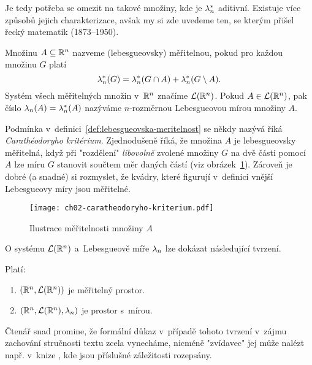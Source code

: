 Je tedy potřeba se omezit na takové množiny, kde je $\lambda_n^*$ aditivní. Existuje více způsobů jejich charakterizace, avšak my si zde uvedeme ten, se kterým přišel řecký matematik  (1873--1950).
\begin{definition}\label{def:lebesgueovska-meritelnost}
    Množinu $A\subseteq\mathbb{R}^n$ nazveme (lebesgueovsky) měřitelnou, pokud pro každou množinu $G$ platí
    \[\lambda_n^*(G)=\lambda_n^*(G\cap A)+\lambda_n^*(G\setminus A).\]
    Systém všech měřitelných množin v~$\mathbb{R}^n$ značíme $\mathcal{L}(\mathbb{R}^n)$.  Pokud $A\in\mathcal{L}(\mathbb{R}^n)$, pak číslo $\lambda_n(A)=\lambda_n^*(A)$ nazýváme $n$-rozměrnou Lebesgueovou mírou množiny $A$.
\end{definition}
Podmínka v~definici~\ref{def:lebesgueovska-meritelnost} se někdy nazývá říká \emph{Carathéodoryho kritérium}. Zjednodušeně říká, že množina $A$ je lebesgueovsky měřitelná, když při "rozdělení" \emph{libovolně} zvolené množiny $G$ na dvě části pomocí $A$ lze míru $G$ stanovit součtem měr daných částí (viz obrázek~\ref{fig:caratheodoryho-kriterium}). Zároveň je dobré (a snadné) si rozmyslet, že kvádry, které figurují v~definici vnější Lebesgueovy míry jsou měřitelné.
\begin{figure}[h]
    \centering
    \texttt{[image: ch02-caratheodoryho-kriterium.pdf]}
    \caption{Ilustrace měřitelnosti množiny $A$}
    \label{fig:caratheodoryho-kriterium}
\end{figure}
O systému $\mathcal{L}(\mathbb{R}^n)$ a~Lebesgueově míře $\lambda_n$ lze dokázat následující tvrzení.
\begin{theorem}\label{thm:prostor-s-Lebesgueovou-mirou}
    Platí:
    \begin{enumerate}[label=(\roman*)]
        \item $(\mathbb{R}^n,\mathcal{L}(\mathbb{R}^n))$ je měřitelný prostor.
        \item $(\mathbb{R}^n,\mathcal{L}(\mathbb{R}^n),\lambda_n)$ je prostor s~mírou.
    \end{enumerate}
\end{theorem}
Čtenář snad promine, že formální důkaz v~případě tohoto tvrzení v~zájmu zachování stručnosti textu zcela vynecháme, nicméně "zvídavec" jej může nalézt např. v~knize \citep[str. 347]{Royden2010}, kde jsou příslušné záležitosti rozepsány.
